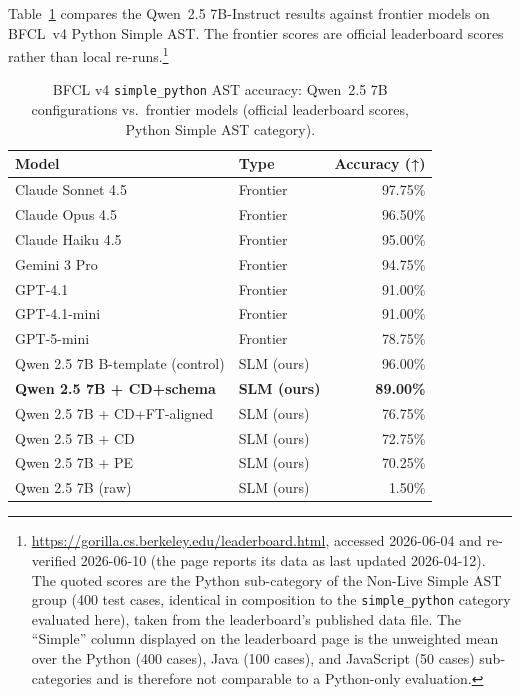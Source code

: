 Table~\ref{tab:frontier-comparison} compares the Qwen~2.5 7B-Instruct results against frontier models on BFCL~v4 Python Simple AST. The frontier scores are official leaderboard scores rather than local re-runs.\footnote{\url{https://gorilla.cs.berkeley.edu/leaderboard.html}, accessed 2026-06-04 and re-verified 2026-06-10 (the page reports its data as last updated 2026-04-12). The quoted scores are the Python sub-category of the Non-Live Simple AST group (400 test cases, identical in composition to the \texttt{simple\_python} category evaluated here), taken from the leaderboard's published data file. The ``Simple'' column displayed on the leaderboard page is the unweighted mean over the Python (400 cases), Java (100 cases), and JavaScript (50 cases) sub-categories and is therefore not comparable to a Python-only evaluation.}

\begin{table}[ht]
\centering
\caption{BFCL v4 \texttt{simple\_python} AST accuracy: Qwen~2.5 7B configurations vs.\ frontier models (official leaderboard scores, Python Simple AST category).}
\label{tab:frontier-comparison}
\begin{tabular}{llr}
\toprule
Model & Type & Accuracy (↑) \\
\midrule
Claude Sonnet 4.5     & Frontier & 97.75\% \\
Claude Opus 4.5       & Frontier & 96.50\% \\
Claude Haiku 4.5      & Frontier & 95.00\% \\
Gemini 3 Pro          & Frontier & 94.75\% \\
GPT-4.1               & Frontier & 91.00\% \\
GPT-4.1-mini          & Frontier & 91.00\% \\
GPT-5-mini            & Frontier & 78.75\% \\
\midrule
Qwen 2.5 7B B-template (control) & SLM (ours) & 96.00\% \\
\textbf{Qwen 2.5 7B + CD+schema}     & \textbf{SLM (ours)} & \textbf{89.00\%}  \\
Qwen 2.5 7B + CD+FT-aligned & SLM (ours) & 76.75\% \\
Qwen 2.5 7B + CD            & SLM (ours) & 72.75\% \\
Qwen 2.5 7B + PE            & SLM (ours) & 70.25\% \\
Qwen 2.5 7B (raw)           & SLM (ours) & 1.50\%  \\
\bottomrule
\end{tabular}
\end{table}

